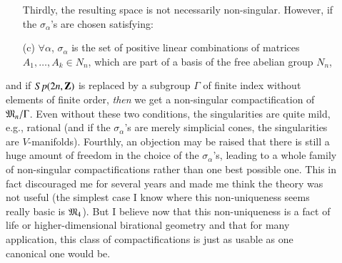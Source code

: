 \begin{description}
\begin{itemize}
Thirdly, the resulting space is not necessarily non-singular. However, if the $\sigma_\alpha$'s are chosen satisfying:

\item[(c)] $\forall \alpha$, $\sigma_\alpha$ is the set of positive linear combinations of matrices $A_1, \ldots, A_k \in N_n$, which are part of a basis of the free abelian group $N_n$,
\end{itemize}
and if $Sp(2n, \mathbf{Z})$ is replaced by a subgroup $\Gamma$ of finite index without elements of finite order, \textit{then} we get a non-singular compactification of $\mathfrak{M}_n/ \Gamma$. Even without these two conditions, the singularities are quite mild, e.g., rational (and if the $\sigma_\alpha$'s are merely simplicial cones, the singularities are $V$-manifolds). Fourthly, an objection may be raised that there is still a huge amount of freedom in the choice of the $\sigma_\alpha$'s, leading to a whole family of non-singular compactifications rather than one best possible one. This in fact discouraged me for several years and made me think the theory was not useful (the simplest case I know where this non-uniqueness seems really basic is $\mathfrak{M}_4$). But I believe now that this non-uniqueness is a fact of life or higher-dimensional birational geometry and that for many application, this class of compactifications is just as usable as one canonical one would be.
\end{description}

